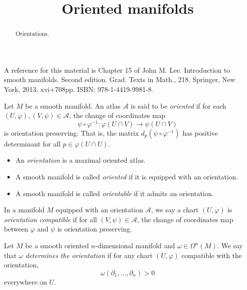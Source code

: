 \documentclass{ximera}
\title{Oriented manifolds}
\begin{document}
    \begin{abstract} Orientations.   \end{abstract}
    \maketitle

    A reference for this material is Chapter 15 of John M. Lee. Introduction to smooth manifolds. Second edition. Grad. Texts in Math., 218. Springer, New York, 2013. xvi+708pp. ISBN: 978-1-4419-9981-8.

    \begin{definition}[Orientation]
        Let $M$ be a smooth manifold. An atlas $\mathcal{A} $ is said to be  \emph{oriented} if for each $ (U, \varphi) , (V, \psi ) \in \mathcal{A}$, the change of coordinates map
        \[   \psi  \circ \varphi   ^{-1} : \varphi  (U \cap V ) \to \psi (U \cap V )      \]
        is orientation preserving. That is, the matrix $  d_p (\psi \circ \varphi  ^{-1} )   $ has positive determinant for all $p \in \varphi  (U \cap U ) $. 

        \begin{itemize}
            \item An \emph{orientation} is a maximal oriented atlas.
            \item A smooth manifold  is called \emph{oriented} if it is equipped with an orientation. 
            \item A smooth manifold is called \emph{orientable} if it admits an orientation.
        \end{itemize}
    \end{definition}


    \begin{definition} In a manifold $M$ equipped with an orientation $\mathcal{A}$, we say a chart $(U, \varphi)$ is \emph{orientation compatible} if for all $(V, \psi ) \in \mathcal{A}$, the change of coordinates map between $\varphi $ and $\psi$ is orientation preserving. 
    \end{definition}

    


    \begin{definition}
        Let $M$ be a smooth oriented $n$-dimensional manifold and $\omega \in \Omega ^n (M)$. We say that $\omega$ \emph{determines the orientation} if for any chart $(U , \varphi )$ compatible with the orientation, 
        \[    \omega ( \partial _1  , \ldots , \partial _n   )  > 0      \]
        everywhere on $U$. 
    \end{definition}
\end{document}
